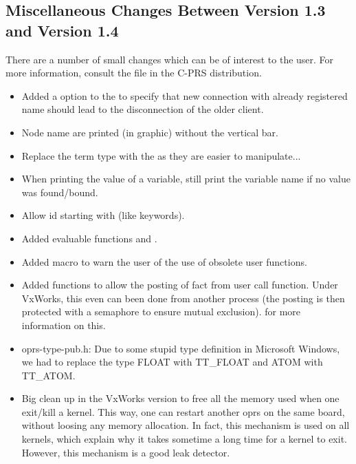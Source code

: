 \subsection{Miscellaneous Changes Between Version 1.3 and Version 1.4}

There are a number of small changes which can be of interest to the user. For
more information, consult the  file in the C-PRS distribution.

\begin{itemize}

\item Added a  option to the \MP{} to specify that new connection with
already registered name should lead to the disconnection of the older client.

\item Node name are printed (in graphic) without the vertical bar. 

\item Replace the  term type with the
 as they are easier to manipulate...

\item When printing the value of a variable, still print the variable name if
no value was found/bound.

\item Allow id starting with \samp{:} (like keywords). 

\item Added evaluable functions  and .

\item Added macro to warn the user of the use of obsolete user functions.

\item Added functions to allow the posting of fact from user call function.
Under VxWorks, this even can been done from another process (the posting is
then protected with a semaphore to ensure mutual exclusion).  for more information on this.

\item oprs-type-pub.h: Due to some stupid type definition in Microsoft Windows,
we had to replace the type FLOAT with TT\_FLOAT and ATOM with TT\_ATOM.

\item Big clean up in the VxWorks version to free all the memory used
when one exit/kill a kernel. This way, one can restart another oprs on
the same board, without loosing any memory allocation. In fact, this mechanism
is used on all kernels, which explain why it takes sometime a long time for a
kernel to exit. However, this mechanism is a good leak detector.


\end{itemize}
